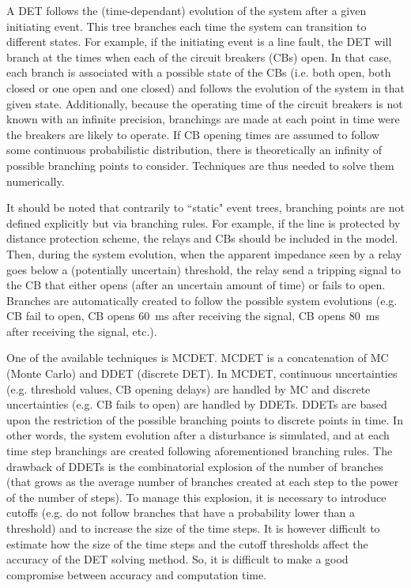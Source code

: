 A DET follows the (time-dependant) evolution of the system after a given initiating event. This tree branches each time the system can transition to different states. For example, if the initiating event is a line fault, the DET will branch at the times when each of the circuit breakers (CBs) open. In that case, each branch is associated with a possible state of the CBs (i.e. both open, both closed or one open and one closed) and follows the evolution of the system in that given state. Additionally, because the operating time of the circuit breakers is not known with an infinite precision, branchings are made at each point in time were the breakers are likely to operate. If CB opening times are assumed to follow some continuous probabilistic distribution, there is theoretically an infinity of possible branching points to consider. Techniques are thus needed to solve them numerically.

It should be noted that contrarily to ``static" event trees, branching points are not defined explicitly but via branching rules. For example, if the line is protected by distance protection scheme, the relays and CBs should be included in the model. Then, during the system evolution, when the apparent impedance seen by a relay goes below a (potentially uncertain) threshold, the relay send a tripping signal to the CB that either opens (after an uncertain amount of time) or fails to open. Branches are automatically created to follow the possible system evolutions (e.g. CB fail to open, CB opens 60~ms after receiving the signal, CB opens 80~ms after receiving the signal, etc.).

One of the available techniques is MCDET. MCDET is a concatenation of MC (Monte Carlo) and DDET (discrete DET). In MCDET, continuous uncertainties (e.g. threshold values, CB opening delays) are handled by MC and discrete uncertainties (e.g. CB fails to open) are handled by DDETs. DDETs are based upon the restriction of the possible branching points to discrete points in time. In other words, the system evolution after a disturbance is simulated, and at each time step branchings are created following aforementioned branching rules. The drawback of DDETs is the combinatorial explosion of the number of branches (that grows as the average number of branches created at each step to the power of the number of steps). To manage this explosion, it is necessary to introduce cutoffs (e.g. do not follow branches that have a probability lower than a threshold) and to increase the size of the time steps. It is however difficult to estimate how the size of the time steps and the cutoff thresholds affect the accuracy of the DET solving method. So, it is difficult to make a good compromise between accuracy and computation time.

